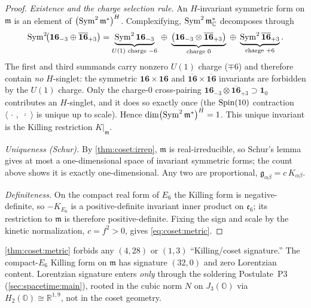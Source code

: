 \begin{proof}
\emph{Existence and the charge selection rule.} An $H$-invariant symmetric form
on $\mathfrak m$ is an element of $\bigl(\operatorname{Sym}^{2}\mathfrak m^{*}\bigr)^{H}$.
Complexifying, $\operatorname{Sym}^{2}\mathfrak m_{\mathbb C}^{*}$ decomposes through
\begin{equation}\label{eq:coset:sym2}
  \operatorname{Sym}^{2}\!\bigl(\mathbf{16}_{-3}\oplus\overline{\mathbf{16}}_{+3}\bigr)
  = \underbrace{\operatorname{Sym}^{2}\mathbf{16}_{-3}}_{U(1)\text{ charge }-6}
    \;\oplus\;
    \underbrace{\bigl(\mathbf{16}_{-3}\otimes\overline{\mathbf{16}}_{+3}\bigr)}_{\text{charge }0}
    \;\oplus\;
    \underbrace{\operatorname{Sym}^{2}\overline{\mathbf{16}}_{+3}}_{\text{charge }+6}.
\end{equation}
The first and third summands carry nonzero $U(1)$ charge ($\mp 6$) and therefore
contain \emph{no} $H$-singlet: the symmetric $\mathbf{16}\times\mathbf{16}$ and
$\overline{\mathbf{16}}\times\overline{\mathbf{16}}$ invariants are forbidden by
the $U(1)$ charge. Only the charge-$0$ cross-pairing $\mathbf{16}_{-3}\otimes
\overline{\mathbf{16}}_{+3}\supset\mathbf 1_{0}$ contributes an $H$-singlet, and
it does so exactly once (the $\operatorname{Spin}(10)$ contraction
$\langle\,\cdot\,,\,\overline{\,\cdot\,}\,\rangle$ is unique up to scale). Hence
$\dim\bigl(\operatorname{Sym}^{2}\mathfrak m^{*}\bigr)^{H} = 1$. This unique invariant is the
Killing restriction $K|_{\mathfrak m}$.

\emph{Uniqueness (Schur).} By \autoref{thm:coset:irrep}, $\mathfrak m$ is
real-irreducible, so Schur's lemma gives at most a one-dimensional space of
invariant symmetric forms; the count above shows it is exactly one-dimensional.
Any two are proportional, $\mathfrak g_{\alpha\beta} = c\,K_{\alpha\beta}$.

\emph{Definiteness.} On the compact real form of $E_{6}$ the Killing form is
negative-definite, so $-K_{E_{6}}$ is a positive-definite invariant inner
product on $\mathfrak e_{6}$; its restriction to $\mathfrak m$ is therefore
positive-definite. Fixing the sign and scale by the kinetic normalization,
$c = f^{2}>0$, gives \eqref{eq:coset:metric}.
\end{proof}

\begin{remark}\label{rem:coset:nolorentz}
\autoref{thm:coset:metric} forbids any $(4,28)$ or $(1,3)$ ``Killing/coset
signature.'' The compact-$E_{6}$ Killing form on $\mathfrak m$ has signature
$(32,0)$ and zero Lorentzian content. Lorentzian signature enters \emph{only}
through the soldering Postulate~P3 (\autoref{sec:spacetime:main}), rooted in the cubic
norm $N$ on $J_{3}(\mathbb O)$ via $H_{2}(\mathbb O)\cong\mathbb R^{1,9}$, not in
the coset geometry.
\end{remark}

